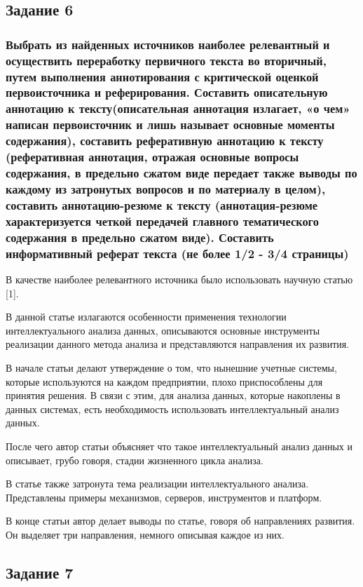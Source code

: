 \documentclass[14pt,a4paper,report]{report}
\begin{document}
\subsection{Задание 6}

\subsubsection{Выбрать из найденных источников наиболее релевантный и осуществить переработку первичного текста во вторичный, путем выполнения аннотирования с критической оценкой первоисточника и реферирования. Составить описательную аннотацию к тексту(описательная аннотация излагает, «о чем» написан первоисточник и лишь называет основные моменты содержания), составить реферативную аннотацию к тексту (реферативная аннотация, отражая основные вопросы содержания, в предельно сжатом виде передает также выводы по каждому из затронутых вопросов и по материалу в целом), составить аннотацию-резюме к тексту (аннотация-резюме характеризуется четкой передачей главного тематического содержания в предельно сжатом виде). Составить информативный реферат текста (не более 1/2 - 3/4 страницы)}

В качестве наиболее релевантного источника было использовать научную статью [1].

В данной статье излагаются особенности применения технологии интеллектуального анализа данных, описываются основные инструменты реализации данного метода анализа и представляются направления их развития.

В начале статьи делают утверждение о том, что нынешние учетные системы, которые используются на каждом предприятии, плохо приспособлены для принятия решения. В связи с этим, для анализа данных, которые накоплены в данных системах, есть необходимость использовать интеллектуальный анализ данных.

После чего автор статьи объясняет что такое интеллектуальный анализ данных и описывает, грубо говоря, стадии жизненного цикла анализа.

В статье также затронута тема реализации интеллектуального анализа. Представлены примеры механизмов, серверов, инструментов и платформ.

В конце статьи автор делает выводы по статье, говоря об направлениях развития. Он выделяет три направления, немного описывая каждое из них.


\subsection{Задание 7}
\end{document}

